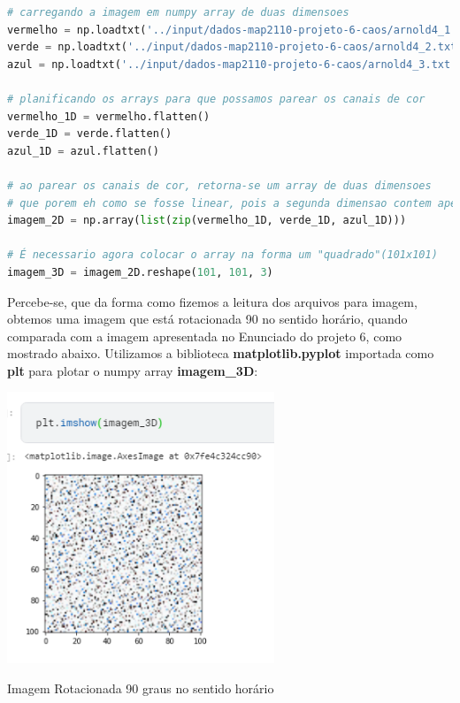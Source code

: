 \documentclass[a4paper, 12pt]{article}
\begin{document}
\begin{lstlisting}[language=Python, caption = Lendo dos arquivos .txt e armazenando em estruturas numpy array]
# carregando a imagem em numpy array de duas dimensoes
vermelho = np.loadtxt('../input/dados-map2110-projeto-6-caos/arnold4_1.txt', delimiter='  ')
verde = np.loadtxt('../input/dados-map2110-projeto-6-caos/arnold4_2.txt', delimiter='  ')
azul = np.loadtxt('../input/dados-map2110-projeto-6-caos/arnold4_3.txt', delimiter='   ')

# planificando os arrays para que possamos parear os canais de cor
vermelho_1D = vermelho.flatten()
verde_1D = verde.flatten()
azul_1D = azul.flatten()

# ao parear os canais de cor, retorna-se um array de duas dimensoes
# que porem eh como se fosse linear, pois a segunda dimensao contem apenas os tres canais de cor
imagem_2D = np.array(list(zip(vermelho_1D, verde_1D, azul_1D)))

# É necessario agora colocar o array na forma um "quadrado"(101x101)
imagem_3D = imagem_2D.reshape(101, 101, 3)
\end{lstlisting}

Percebe-se, que da forma como fizemos a leitura dos arquivos para imagem, obtemos uma imagem que está rotacionada 90 no sentido horário, quando comparada com a imagem apresentada no Enunciado do projeto 6, como mostrado abaixo. Utilizamos a biblioteca \textbf{matplotlib.pyplot} importada como \textbf{plt} para plotar o numpy array \textbf{imagem\_3D}:

\begin{center}
    \includegraphics[width=8cm]{01_plot_imagem_3D.PNG}
    
    Imagem Rotacionada 90 graus no sentido horário
\end{center}
\end{document}
